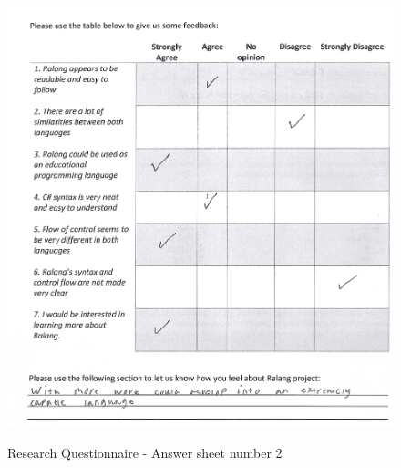 \documentclass[a4paper]{article}
\begin{document}
\begin{appendices}
\begin{figure}[h!]
{			\includegraphics[width=\linewidth]{images/scan2.jpg}}
		\caption{Research Questionnaire - Answer sheet number 2}
	\end{figure}
	\newpage
	\begin{figure}[h!]

\end{figure}
\end{appendices}
\end{document}

